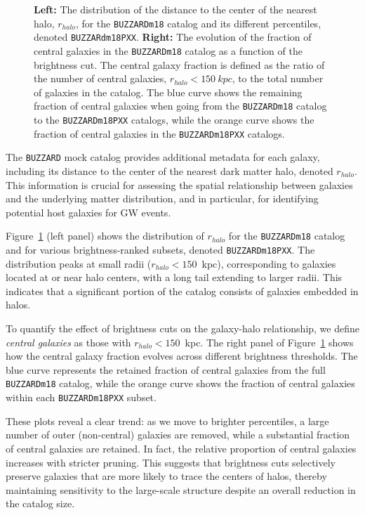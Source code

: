\begin{figure}[h!]
\begin{subfigure}{0.45\textwidth}
    \end{subfigure}
    \caption[$r_{halo}$ distribution and evolution for \texttt{BUZZARDm18} and its percentiles.]{\textbf{Left:} The distribution of the distance to the center of the nearest halo, $r_{halo}$, for the \texttt{BUZZARDm18} catalog and its different percentiles, denoted \texttt{BUZZARdm18PXX}. \textbf{Right:} The evolution of the fraction of central galaxies in the \texttt{BUZZARDm18} catalog as a function of the brightness cut. The central galaxy fraction is defined as the ratio of the number of central galaxies, $r_{halo} < 150~kpc$, to the total number of galaxies in the catalog. The blue curve shows the remaining fraction of central galaxies when going from the \texttt{BUZZARDm18} catalog to the \texttt{BUZZARDm18PXX} catalogs, while the orange curve shows the fraction of central galaxies in the \texttt{BUZZARDm18PXX} catalogs.}
    \label{fig:MDC_rhalo}
\end{figure}

The \texttt{BUZZARD} mock catalog provides additional metadata for each galaxy, including its distance to the center of the nearest dark matter halo, denoted $r_{halo}$. This information is crucial for assessing the spatial relationship between galaxies and the underlying matter distribution, and in particular, for identifying potential host galaxies for \ac{GW} events.

Figure~\ref{fig:MDC_rhalo} (left panel) shows the distribution of $r_{halo}$ for the \texttt{BUZZARDm18} catalog and for various brightness-ranked subsets, denoted \texttt{BUZZARDm18PXX}. The distribution peaks at small radii ($r_{halo} < 150$~kpc), corresponding to galaxies located at or near halo centers, with a long tail extending to larger radii. This indicates that a significant portion of the catalog consists of galaxies embedded in halos.

To quantify the effect of brightness cuts on the galaxy-halo relationship, we define \textit{central galaxies} as those with $r_{halo} < 150$~kpc. The right panel of Figure~\ref{fig:MDC_rhalo} shows how the central galaxy fraction evolves across different brightness thresholds. The blue curve represents the retained fraction of central galaxies from the full \texttt{BUZZARDm18} catalog, while the orange curve shows the fraction of central galaxies within each \texttt{BUZZARDm18PXX} subset.

These plots reveal a clear trend: as we move to brighter percentiles, a large number of outer (non-central) galaxies are removed, while a substantial fraction of central galaxies are retained. In fact, the relative proportion of central galaxies increases with stricter pruning. This suggests that brightness cuts selectively preserve galaxies that are more likely to trace the centers of halos, thereby maintaining sensitivity to the large-scale structure despite an overall reduction in the catalog size.

